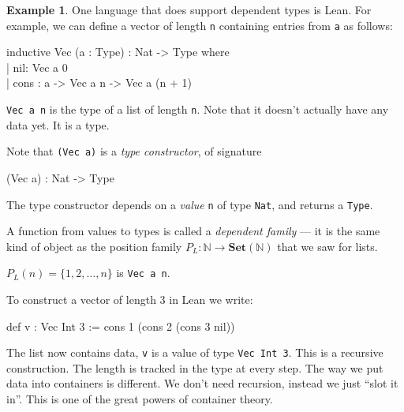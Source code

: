 \documentclass[11pt, a4paper]{article}
\theoremstyle{definition}
\newtheorem{example}[definition]{Example}
\theoremstyle{plain}
\begin{document}
\noindent\colorbox{blue!10}{\parbox{\dimexpr\linewidth-2\fboxsep}{%
\begin{example}\label{ex:lean-dependent}
One language that does support dependent types is Lean.
For example, we can define a vector of length \texttt{n} containing
entries from \texttt{a} as follows:
\begin{center}
\colorbox{gray!15}{\begin{minipage}{0.85\linewidth}
\ttfamily
inductive Vec (a : Type) : Nat -> Type where\\
\hspace*{1.5em}| nil\hspace*{1.5em}: Vec a 0\\
\hspace*{1.5em}| cons : a -> Vec a n -> Vec a (n + 1)
\end{minipage}}
\end{center}
\texttt{Vec a n} is the type of a list of length \texttt{n}.  Note that it
doesn't actually have any data yet.  It is a type.

Note that \texttt{(Vec a)} is a \emph{type constructor}, of signature
\begin{center}
\colorbox{gray!15}{\begin{minipage}{0.85\linewidth}
\ttfamily
(Vec a) : Nat -> Type
\end{minipage}}
\end{center}
The type constructor depends on a \emph{value} \texttt{n} of type
\texttt{Nat}, and returns a \texttt{Type}.

A function
from values to types is called a \emph{dependent family} --- it is the
same kind of object as the position family
$P_L : \mathbb{N} \to \mathbf{Set}(\mathbb{N})$ that we saw for lists.

$P_L(n) = \{1, 2, \ldots, n\}$ is \texttt{Vec a n}.

To construct a vector of length 3 in Lean we write:
\begin{center}
\colorbox{gray!15}{\begin{minipage}{0.85\linewidth}
\ttfamily
def v : Vec Int 3 := cons 1 (cons 2 (cons 3 nil))
\end{minipage}}
\end{center}
The list now contains data, \texttt{v} is a value of type
\texttt{Vec Int 3}.
This is a recursive construction.  The length is tracked in the type at every step.
The way we put data into containers is different.  We don't need
recursion, instead we just ``slot it in''.  This is one of the great
powers of container theory.


\end{example}}}
\end{document}

